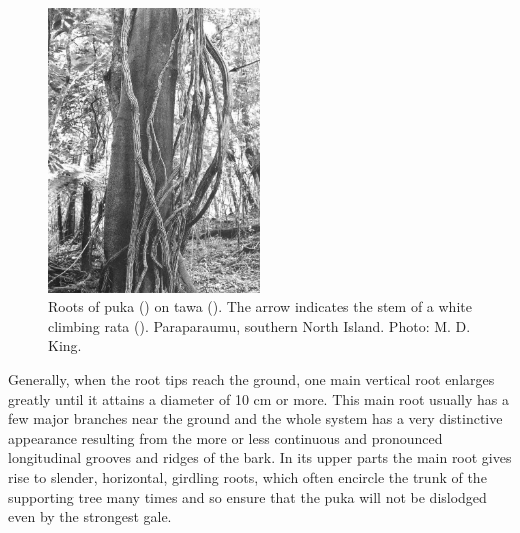 \begin{figure}
	\includegraphics[width=0.5\textwidth]{graphics/figure47puka-roots.jpg}
	\centering
	\caption[Roots of puka on tawa]{Roots of puka () on tawa ().
	The arrow indicates the stem of a white climbing rata ().
	Paraparaumu, southern North Island.
	Photo: M. D. King.}%
	\label{fig:47puka-roots}
\end{figure}

Generally, when the root tips reach the ground, one main vertical root enlarges greatly until it attains a diameter of 10 cm or more.
This main root usually has a few major branches near the ground and the whole system has a very distinctive appearance resulting from the more or less continuous and pronounced longitudinal grooves and ridges of the bark.
In its upper parts the main root gives rise to slender, horizontal, girdling roots, which often encircle the trunk of the supporting tree many times and so ensure that the puka will not be dislodged even by the strongest gale.

